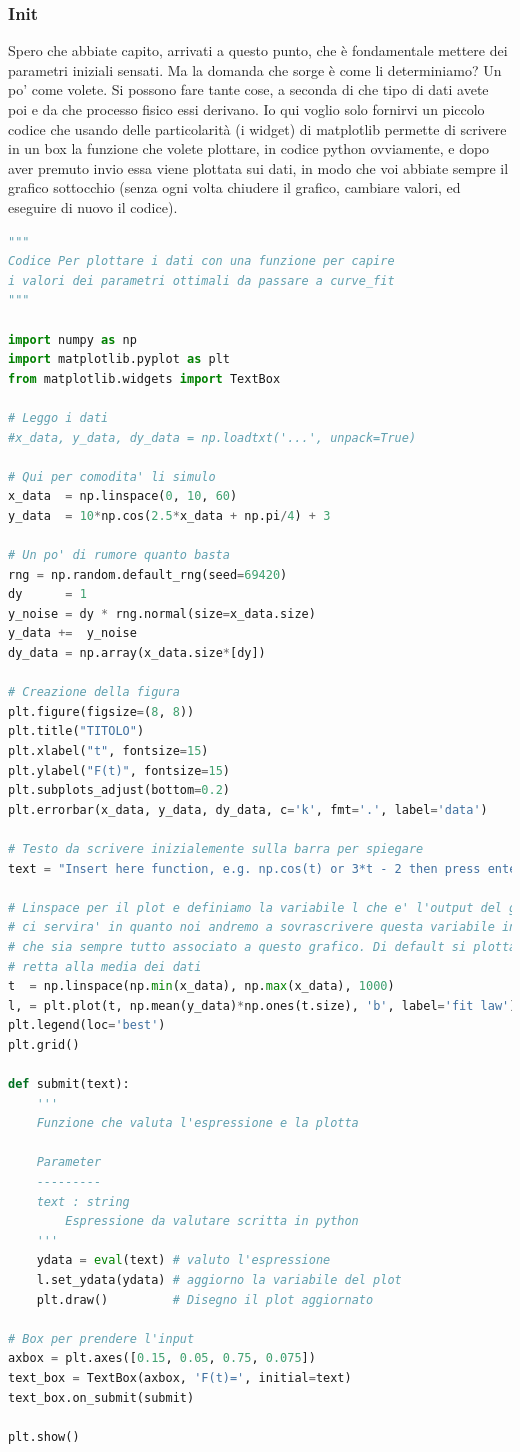 \documentclass[10pt,a4paper]{article}
\begin{document}
\subsubsection{Init}
Spero che abbiate capito, arrivati a questo punto, che è fondamentale mettere dei parametri iniziali sensati. Ma la domanda che sorge è come li determiniamo? Un po' come volete. Si possono fare tante cose, a seconda di che tipo di dati avete poi e da che processo fisico essi derivano. Io qui voglio solo fornirvi un piccolo codice che usando delle particolarità (i widget) di matplotlib permette di scrivere in un box la funzione che volete plottare, in codice python ovviamente, e dopo aver premuto invio essa viene plottata sui dati, in modo che voi abbiate sempre il grafico sottocchio (senza ogni volta chiudere il grafico, cambiare valori, ed eseguire di nuovo il codice).
\begin{lstlisting}[language=Python]
"""
Codice Per plottare i dati con una funzione per capire
i valori dei parametri ottimali da passare a curve_fit
"""

import numpy as np
import matplotlib.pyplot as plt
from matplotlib.widgets import TextBox

# Leggo i dati
#x_data, y_data, dy_data = np.loadtxt('...', unpack=True)

# Qui per comodita' li simulo
x_data  = np.linspace(0, 10, 60)
y_data  = 10*np.cos(2.5*x_data + np.pi/4) + 3

# Un po' di rumore quanto basta
rng = np.random.default_rng(seed=69420)
dy      = 1
y_noise = dy * rng.normal(size=x_data.size)
y_data +=  y_noise
dy_data = np.array(x_data.size*[dy])

# Creazione della figura
plt.figure(figsize=(8, 8))
plt.title("TITOLO")
plt.xlabel("t", fontsize=15)
plt.ylabel("F(t)", fontsize=15)
plt.subplots_adjust(bottom=0.2)
plt.errorbar(x_data, y_data, dy_data, c='k', fmt='.', label='data')

# Testo da scrivere inizialemente sulla barra per spiegare
text = "Insert here function, e.g. np.cos(t) or 3*t - 2 then press enter"

# Linspace per il plot e definiamo la variabile l che e' l'output del grafico
# ci servira' in quanto noi andremo a sovrascrivere questa variabile in modo
# che sia sempre tutto associato a questo grafico. Di default si plotta una
# retta alla media dei dati
t  = np.linspace(np.min(x_data), np.max(x_data), 1000)
l, = plt.plot(t, np.mean(y_data)*np.ones(t.size), 'b', label='fit law')
plt.legend(loc='best')
plt.grid()

def submit(text):
    '''
    Funzione che valuta l'espressione e la plotta

    Parameter
    ---------
    text : string
        Espressione da valutare scritta in python
    '''
    ydata = eval(text) # valuto l'espressione
    l.set_ydata(ydata) # aggiorno la variabile del plot
    plt.draw()         # Disegno il plot aggiornato

# Box per prendere l'input
axbox = plt.axes([0.15, 0.05, 0.75, 0.075])
text_box = TextBox(axbox, 'F(t)=', initial=text)
text_box.on_submit(submit)

plt.show()
\end{lstlisting}
\newpage
\end{document}

